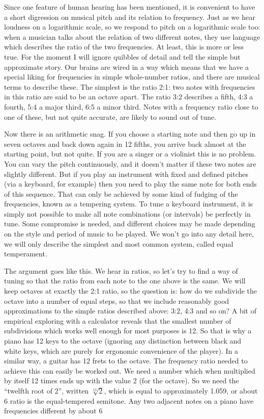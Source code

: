 

  Since one feature of human hearing has been mentioned, it is convenient to 
  have a short digression on musical pitch and its relation to frequency. Just 
  as we hear loudness on a logarithmic scale, so we respond to pitch on a 
  logarithmic scale too: when a musician talks about the relation of two 
  different notes, they use language which describes the ratio of the two 
  frequencies. At least, this is more or less true. For the moment I will 
  ignore quibbles of detail and tell the simple but approximate story. Our 
  brains are wired in a way which means that we have a special liking for 
  frequencies in simple whole-number ratios, and there are musical terms to 
  describe these. The simplest is the ratio 2:1: two notes with frequencies in 
  this ratio are said to be an octave apart. The ratio 3:2 describes a fifth, 
  4:3 a fourth, 5:4 a major third, 6:5 a minor third. Notes with a frequency 
  ratio close to one of these, but not quite accurate, are likely to sound out 
  of tune. 

  Now there is an arithmetic snag. If you choose a starting note and then go up 
  in seven octaves and back down again in 12 fifths, you arrive back almost at 
  the starting point, but not quite. If you are a singer or a violinist this is 
  no problem. You can vary the pitch continuously, and it doesn't matter if 
  these two notes are slightly different. But if you play an instrument with 
  fixed and defined pitches (via a keyboard, for example) then you need to play 
  the same note for both ends of this sequence. That can only be achieved by 
  some kind of fudging of the frequencies, known as a tempering system. To tune 
  a keyboard instrument, it is simply not possible to make all note 
  combinations (or intervals) be perfectly in tune. Some compromise is needed, 
  and different choices may be made depending on the style and period of music 
  to be played. We won't go into any detail here, we will only describe the 
  simplest and most common system, called equal temperament. 

  The argument goes like this. We hear in ratios, so let's try to find a way of 
  tuning so that the ratio from each note to the one above is the same. We will 
  keep octaves at exactly the 2:1 ratio, so the question is: how do we 
  subdivide the octave into a number of equal steps, so that we include 
  reasonably good approximations to the simple ratios described above: 3:2, 4:3 
  and so on? A bit of empirical exploring with a calculator reveals that the 
  smallest number of subdivisions which works well enough for most purposes is 
  12. So that is why a piano has 12 keys to the octave (ignoring any 
  distinction between black and white keys, which are purely for ergonomic 
  convenience of the player). In a similar way, a guitar has 12 frets to the 
  octave. The frequency ratio needed to achieve this can easily be worked out. 
  We need a number which when multiplied by itself 12 times ends up with the 
  value 2 (for the octave). So we need the ``twelfth root of 2'', written 
  $\sqrt[12]{2}$, which is equal to approximately 1.059, or about 6%
  ratio is the equal-tempered semitone. Any two adjacent notes on a piano have 
  frequencies different by about 6%


